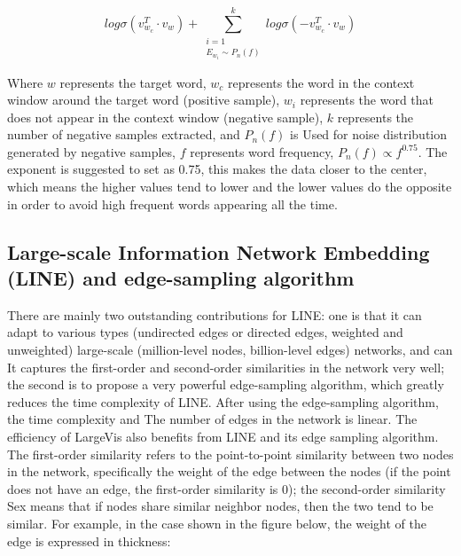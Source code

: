 \begin{equation*}
    {log \sigma(v_{w_c}^T \cdot v_w)} + {\sum^k_{\substack{i=1\\ {E_{w_i} \sim P_n(f)}}}log \sigma(-v_{w_c}^T \cdot v_w)}
\end{equation*}

\noindent Where $w$ represents the target word, $w_c$ represents the word in the context window around the target word (positive sample), $w_i$ represents the word that does not appear in the context window (negative sample), $k$ represents the number of negative samples extracted, and $P_n(f)$ is Used for noise distribution generated by negative samples, $f$ represents word frequency, $P_n(f)∝f^{0.75}$. The exponent is suggested to set as 0.75\cite{ref7}, this makes the data closer to the center, which means the 
higher values tend to lower and the lower values do the opposite in order to avoid high frequent words appearing all the time.

\subsection{Large-scale Information Network Embedding (LINE) and edge-sampling algorithm}

\noindent There are mainly two outstanding contributions for LINE: one is that it can adapt to various types (undirected edges or directed edges, weighted and unweighted) large-scale (million-level nodes, billion-level edges) networks, and can It captures the first-order and second-order similarities in the network very well; the second is to propose a very powerful edge-sampling algorithm, which greatly reduces the time complexity of LINE. After using the edge-sampling algorithm, the time complexity and The number of edges in the network is linear. The efficiency of LargeVis also benefits from LINE and its edge sampling algorithm.\\

\noindent The first-order similarity refers to the point-to-point similarity between two nodes in the network, specifically the weight of the edge between the nodes (if the point does not have an edge, the first-order similarity is 0); the second-order similarity Sex means that if nodes share similar neighbor nodes, then the two tend to be similar. For example, in the case shown in the figure below, the weight of the edge is expressed in thickness:

